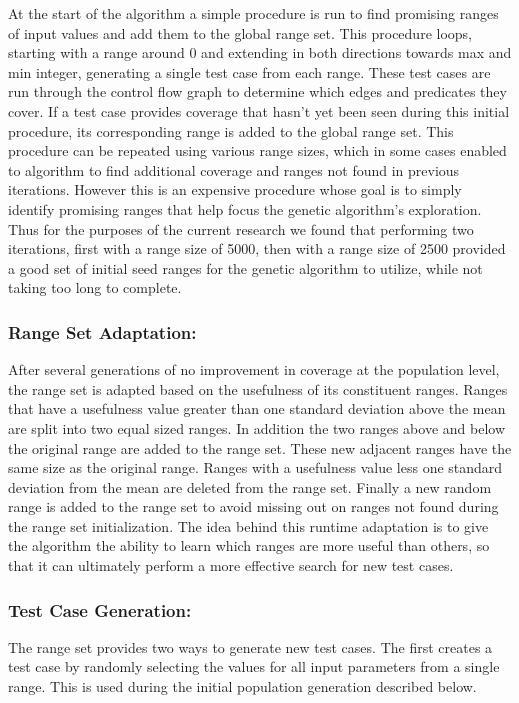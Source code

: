 \documentclass[runningheads]{llncs}
\begin{document}
At the start of the algorithm a simple procedure is run to find promising ranges of input values and add them to the global range set. This procedure loops, starting with a range around 0 and extending in both directions towards max and min integer, generating a single test case from each range. These test cases are run through the control flow graph to determine which edges and predicates they cover. If a test case provides coverage that hasn't yet been seen during this initial procedure, its corresponding range is added to the global range set. This procedure can be repeated using various range sizes, which in some cases enabled to algorithm to find additional coverage and ranges not found in previous iterations. However this is an expensive procedure whose goal is to simply identify promising ranges that help focus the genetic algorithm's exploration. Thus for the purposes of the current research we found that performing two iterations, first with a range size of 5000, then with a range size of 2500 provided a good set of initial seed ranges for the genetic algorithm to utilize, while not taking too long to complete.

\subsubsection{Range Set Adaptation:}

After several generations of no improvement in coverage at the population level, the range set is adapted based on the usefulness of its constituent ranges. Ranges that have a usefulness value greater than one standard deviation above the mean are split into two equal sized ranges. In addition the two ranges above and below the original range are added to the range set. These new adjacent ranges have the same size as the original range. Ranges with a usefulness value less one standard deviation from the mean are deleted from the range set. Finally a new random range is added to the range set to avoid missing out on ranges not found during the range set initialization.
The idea behind this runtime adaptation is to give the algorithm the ability to learn which ranges are more useful than others, so that it can ultimately perform a more effective search for new test cases. 

\subsubsection{Test Case Generation:}

The range set provides two ways to generate new test cases. The first creates a test case by randomly selecting the values for all input parameters from a single range. This is used during the initial population generation described below. 
\end{document}
